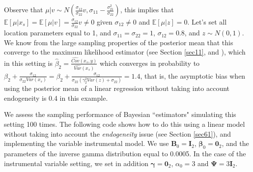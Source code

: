Observe that $\mu|v\sim N\left(\frac{\sigma_{12}}{\sigma_{22}}v,\sigma_{11}-\frac{\sigma_{21}^2}{\sigma_{22}}\right)$, this implies that $\mathbb{E}[\mu|x_s]=\mathbb{E}[\mu|v]=\frac{\sigma_{12}}{\sigma_{22}}v\neq 0$ given $\sigma_{12}\neq 0$ and $\mathbb{E}[\mu|z]=0$.
Let's set all location parameters equal to 1, and $\sigma_{11}=\sigma_{22}=1$, $\sigma_{12}=0.8$, and $z\sim N(0,1)$. We know from the large sampling properties of the posterior mean that this converge to the maximum likelihood estimator (see Section \ref{sec11}, and \cite{Lehmann2003,van2000asymptotic}), which in this setting is $\hat{\beta}_2=\frac{\widehat{Cov}(x_s,y)}{\widehat{Var}(x_s)}$ which converges in probability to $\beta_2+\frac{\sigma_{12}}{\sigma_{22}Var(x_s)}=\beta_2+\frac{\sigma_{12}}{\sigma_{22}(\gamma_2^2Var(z)+\sigma_{22})}=1.4$, that is, the asymptotic bias when using the posterior mean of a linear regression without taking into account endogeneity is 0.4 in this example.

We assess the sampling performance of Bayesian ``estimators" simulating this setting 100 times. The following code shows how to do this using a linear model without taking into account the \textit{endogeneity} issue (see Section \ref{sec61}), and implementing the variable instrumental model. We use $\bm{B}_0=\bm{I}_2$, $\bm{\beta}_0=\bm{0}_2$, and the parameters of the inverse gamma distribution equal to 0.0005. In the case of the instrumental variable setting, we set in addition $\bm{\gamma}=\bm{0}_2$, $\alpha_0=3$ and $\bm{\Psi}=3\bm{I}_2$. 

